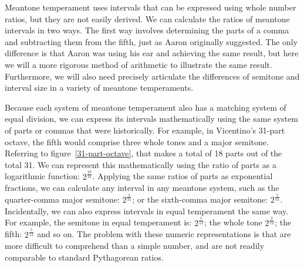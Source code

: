 Meantone temperament uses intervals that can be expressed using whole number ratios,
but they are not easily derived.  We can calculate the ratios of meantone intervals in
two ways. The first way involves determining the parts of a comma and subtracting them
from the fifth, just as Aaron originally suggested.  The only difference is that Aaron
was using his ear and achieving the same result, but here we will a more rigorous
method of arithmetic to illustrate the same result.  Furthermore, we will also need
precisely articulate the differences of semitone and interval size in a variety of
meantone temperaments.

Because each system of meantone temperament also has a matching system of equal
division, we can express its intervals mathematically using the same system of parts or
commas that were historically.  For example, in Vicentino's 31-part octave, the fifth
would comprise three whole tones and a major semitone. Referring to
figure~\ref{31-part-octave}, that makes a total of 18 parts out of the total 31.  We
can represent this mathematically using the ratio of parts as a logarithmic function:
$2^\frac{18}{31}$.  Applying the same ratios of parts as exponential fractions, we can
calculate any interval in any meantone system, such as the quarter-comma major
semitone: $ 2^\frac{3}{31} $; or the sixth-comma major semitone: $ 2^\frac{5}{55} $.
Incidentally, we can also express intervals in equal temperament the same way.  For
example, the semitone in equal temperament is: $ 2^\frac{1}{12} $; the whole tone $
2^\frac{2}{12} $; the fifth: $ 2^\frac{5}{12} $ and so on.  The problem with these numeric
representations is that are more difficult to comprehend than a simple number, and are
not readily comparable to standard Pythagorean ratios.

